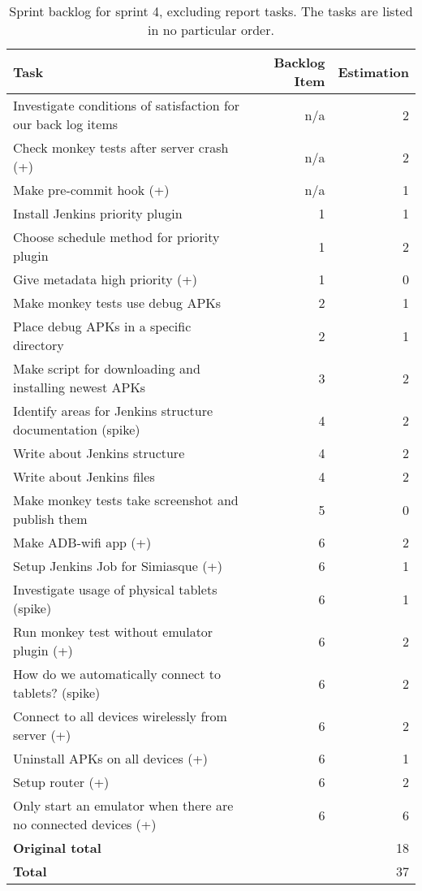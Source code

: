 \begin{table}%
  \centering
  \begin{tabular}{p{}rr}
    \toprule
    \textbf{Task} & \textbf{Backlog Item} & \textbf{Estimation} \\
    \midrule
    Investigate conditions of satisfaction for our back log items & n/a & 2 \\
    Check monkey tests after server crash (+) & n/a & 2 \\
    Make pre-commit hook (+) & n/a & 1 \\
    Install Jenkins priority plugin & 1 & 1 \\
    Choose schedule method for priority plugin & 1 & 2 \\
    Give metadata high priority (+) & 1 & 0 \\
    Make monkey tests use debug APKs & 2 & 1 \\
    Place debug APKs in a specific directory & 2 & 1 \\
    Make script for downloading and installing newest APKs & 3 & 2 \\
    Identify areas for Jenkins structure documentation (spike) & 4 & 2 \\
    Write about Jenkins structure & 4 & 2 \\
    Write about Jenkins files & 4 & 2 \\
    Make monkey tests take screenshot and publish them & 5 & 0 \\
    Make ADB-wifi app (+) & 6 & 2 \\
    Setup Jenkins Job for Simiasque (+) & 6 & 1 \\
    Investigate usage of physical tablets (spike) & 6 & 1 \\
    Run monkey test without emulator plugin (+) & 6 & 2 \\
    How do we automatically connect to tablets? (spike) & 6 & 2 \\
    Connect to all devices wirelessly from server (+) & 6 & 2 \\
    Uninstall APKs on all devices (+) & 6 & 1 \\
    Setup router (+) & 6 & 2 \\
    Only start an emulator when there are no connected devices (+) & 6 & 6 \\
    \midrule
    \textbf{Original total} & & 18 \\
    \textbf{Total} & & 37 \\
    \bottomrule
  \end{tabular}
\caption[Sprint 4 backlog]{Sprint backlog for sprint 4, excluding report tasks. The tasks are listed in no particular order.}
\label{tab:sprint4_tasks}
\end{table}